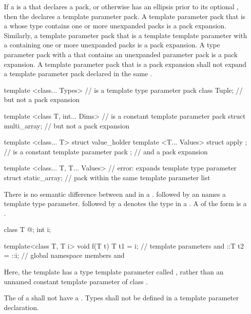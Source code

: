 \pnum
If a  is
a  that declares a pack, or
otherwise has an ellipsis prior to its optional ,
then the 
declares a template parameter pack.
A template parameter pack that is a  whose type
contains one or more unexpanded packs is a pack expansion. Similarly,
a template parameter pack that is a template template parameter with a
 containing one or more unexpanded
packs is a pack expansion.
A type parameter pack with a  that
contains an unexpanded parameter pack is a pack expansion.
A template parameter pack that is a pack
expansion shall not expand a template parameter pack declared in the same
.
\begin{example}
\begin{codeblock}
template <class... Types>                       //  is a template type parameter pack
   class Tuple;                                 // but not a pack expansion

template <class T, int... Dims>                 //  is a constant template parameter pack
   struct multi_array;                          // but not a pack expansion

template <class... T>
  struct value_holder {
    template <T... Values> struct apply { };    //  is a constant template parameter pack
  };                                            // and a pack expansion

template <class... T, T... Values>              // error:  expands template type parameter
  struct static_array;                          // pack  within the same template parameter list
\end{codeblock}
\end{example}

\pnum
There is no semantic difference between
and
in a
.
followed by an
names a template type parameter.
followed by a
denotes the type in a
.
A  of the form
  is a .
\begin{example}
\begin{codeblock}
class T { @\commentellip@ };
int i;

template<class T, T i> void f(T t) {
  T t1 = i;         // template parameters  and 
  ::T t2 = ::i;     // global namespace members  and 
}
\end{codeblock}
Here, the template  has a type template parameter
called , rather than an unnamed constant
template parameter of class .
\end{example}
The  of a 
shall not have a .
Types shall not be defined in a template parameter
declaration.


